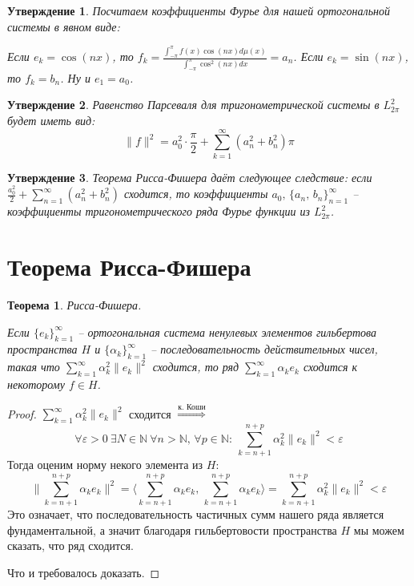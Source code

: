 \documentclass[a4paper,12pt]{article}
\theoremstyle{plain}
\newtheorem{theorem}{Теорема}[section]
\newtheorem{proposition}{Утверждение}[section]
\theoremstyle{definition}
\theoremstyle{remark}
\begin{document}
\begin{proposition}
	Посчитаем коэффициенты Фурье для нашей ортогональной системы в явном виде:

	Если $e_k = \cos(nx)$, то $f_k = \frac{\int_{-\pi}^\pi f(x)\cos(nx)d\mu(x)}{\int_{-\pi}^\pi \cos^2(nx)dx} = a_n$.
	Если $e_k = \sin(nx)$, то $f_k = b_n$.
	Ну и $e_1 = a_0$.
\end{proposition}

\begin{proposition}
	Равенство Парсеваля для тригонометрической системы в $L^2_{2\pi}$ будет иметь вид:
	\[\|f\|^2 = a_0^2\cdot\frac{\pi}{2} + \sum_{k = 1}^\infty (a_n^2 + b_n^2)\pi\]
\end{proposition}

\begin{proposition}
	Теорема Рисса-Фишера даёт следующее следствие: если $\frac{a_0^2}{2} + \sum_{n = 1}^\infty (a_n^2 + b_n^2)$ сходится, то коэффициенты $a_0,\, \{a_n,\,b_n\}_{n = 1}^\infty$ -- коэффициенты тригонометрического ряда Фурье функции из $L_{2\pi}^2$.
\end{proposition}

\section{Теорема Рисса-Фишера}
\begin{theorem}
	Рисса-Фишера.

	Если $\{e_k\}_{k = 1}^\infty$ -- ортогональная система ненулевых элементов гильбертова пространства $H$ и $\{\alpha_k\}_{k = 1}^\infty$ -- последовательность действительных чисел, такая что $\sum_{k = 1}^\infty \alpha_k^2 \|e_k\|^2$ сходится, то ряд $\sum_{k = 1}^\infty \alpha_ke_k$ сходится к некоторому $f \in H$.
\end{theorem}

\begin{proof}
	$\sum_{k = 1}^\infty \alpha_k^2\|e_k\|^2$ сходится $\stackrel{\text{к. Коши}}{\Rightarrow}$
	\[\forall \varepsilon > 0 \: \exists N \in \mathbb{N} \: \forall n > \mathbb{N},\, \forall p \in \mathbb{N}:\: \sum_{k = n + 1}^{n + p} \alpha_k^2\|e_k\|^2 < \varepsilon\]
	Тогда оценим норму некого элемента из $H$:
	\[\|\sum_{k = n + 1}^{n + p}\alpha_ke_k\|^2 = \langle\sum_{k = n + 1}^{n + p}\alpha_ke_k,\, \sum_{k = n + 1}^{n + p}\alpha_ke_k\rangle = \sum_{k = n + 1}^{n + p}\alpha_k^2\|e_k\|^2 < \varepsilon\]
	Это означает, что последовательность частичных сумм нашего ряда является фундаментальной, а значит благодаря гильбертовости пространства $H$ мы можем сказать, что ряд сходится.

	Что и требовалось доказать.
\end{proof}
\end{document}
